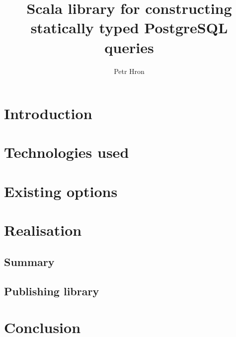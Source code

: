 \documentclass[thesis=B,english]{FITthesis}[2019/12/23]
\title{Scala library for constructing statically typed PostgreSQL queries}
\author{Petr Hron} %
\begin{document}

\chapter{Introduction}



\chapter{Technologies used}





\chapter{Existing options}



\chapter{Realisation}

















\section{Summary}

\section{Publishing library}

\chapter{Conclusion}
\end{document}
